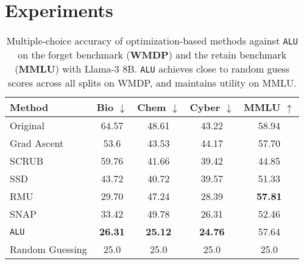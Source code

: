 \section{Experiments}
\label{sec:5}

\begin{table}[t]
    \centering
    \scriptsize
    \caption{Multiple-choice accuracy of optimization-based methods against \texttt{ALU} on the forget benchmark (\textbf{WMDP}) and the retain benchmark (\textbf{MMLU}) with Llama-3 8B. \texttt{ALU} achieves close to random guess scores across all splits on WMDP, and maintains utility on MMLU.}
    \begin{tabular}{l|cccc}
        \toprule
        \textbf{Method} & \textbf{Bio} $\downarrow$ & \textbf{Chem} $\downarrow$ & \textbf{Cyber} $\downarrow$ & \textbf{MMLU} $\uparrow$\\
        \midrule
        Original & 64.57 & 48.61 & 43.22 & 58.94 \\
        Grad Ascent & 53.6 & 43.53 & 44.17 & 57.70\\
        SCRUB & 59.76 & 41.66 & 39.42 & 44.85\\
        SSD & 43.72 & 40.72 & 39.57 & 51.33\\
        RMU & 29.70 & 47.24 & 28.39 & \textbf{57.81}\\
        SNAP & 33.42 & 49.78 & 26.31 & 52.46\\
        \texttt{ALU} & \textbf{26.31} & \textbf{25.12} & \textbf{24.76} & 57.64\\
        \midrule
        Random Guessing & 25.0 & 25.0 & 25.0 & 25.0\\
        \bottomrule
    \end{tabular}
    \label{tab:t1}
    \vspace{-1\baselineskip}
\end{table}

